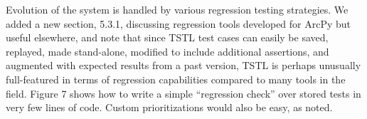 \documentclass{article}[12pt]
\begin{document}
Evolution of the system is handled by various regression testing strategies.  We added a new section, 5.3.1, discussing regression tools developed for ArcPy but useful elsewhere, and note that since TSTL test cases can easily be saved, replayed, made stand-alone, modified to include additional assertions, and augmented with expected results from a past version, TSTL is perhaps unusually full-featured in terms of regression capabilities compared to many tools in the field.  Figure 7 shows how to write a simple ``regression check'' over stored tests in very few lines of code. Custom prioritizations would also be easy, as noted.
\end{document}
